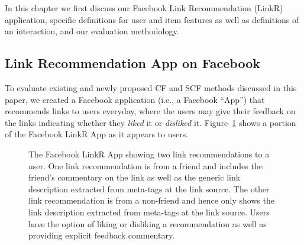 In this chapter we first discuss our Facebook Link Recommendation
(LinkR) application, specific definitions for user and item features
as well as definitions of an interaction, and our evaluation
methodology.

\subsection{Link Recommendation App on Facebook}

To evaluate existing and newly proposed CF and SCF methods discussed in
this paper, we created a Facebook application (i.e., a Facebook
``App'') that recommends links to users everyday, where the users may
give their feedback on the links indicating whether they \emph{liked}
it or \emph{disliked} it.  Figure~\ref{fig:linkr_app} shows a portion
of the Facebook LinkR App as it appears to users.

\begin{figure}[t!]
\hspace{-2mm} 
\caption{The Facebook LinkR App showing two link recommendations to a 
user.  One link recommendation is from a friend and includes the
friend's commentary on the link as well as the generic link
description extracted from meta-tags at the link source.  The other link
recommendation is from a non-friend and hence only shows the link
description extracted from meta-tags at the link source.
Users have the option of liking or disliking a recommendation
as well as providing explicit feedback commentary.}
\label{fig:linkr_app}
\end{figure}

